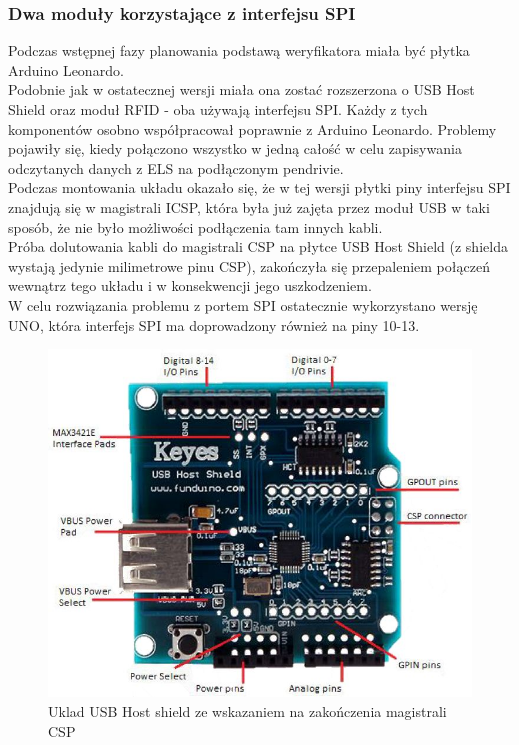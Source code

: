 \documentclass[declaration,shortabstract, mgr]{iithesis}
\begin{document}
\subsubsection{Dwa moduły korzystające z interfejsu SPI}
\indent Podczas wstępnej fazy planowania podstawą weryfikatora miała być płytka Arduino Leonardo. \\
\indent Podobnie jak w ostatecznej wersji miała ona zostać rozszerzona o USB Host Shield oraz moduł RFID - oba używają interfejsu SPI. Każdy z tych komponentów osobno współpracował poprawnie z Arduino Leonardo. Problemy pojawiły się, kiedy połączono wszystko w jedną całość w celu zapisywania odczytanych danych z ELS na podłączonym pendrivie. \\
\indent Podczas montowania układu okazało się, że w tej wersji płytki piny interfejsu SPI znajdują się w magistrali ICSP, która była już zajęta przez moduł USB w taki sposób, że nie było możliwości podłączenia tam innych kabli. \\
\indent Próba dolutowania kabli do magistrali CSP na płytce USB Host Shield (z shielda wystają jedynie milimetrowe pinu CSP), zakończyła się przepaleniem połączeń wewnątrz tego układu i w konsekwencji jego uszkodzeniem. \\
\indent W celu rozwiązania problemu z portem SPI ostatecznie wykorzystano wersję UNO, która interfejs SPI ma doprowadzony również na piny 10-13. \\
\begin{figure}[h]
\caption{Uklad USB Host shield ze wskazaniem na zakończenia magistrali CSP}
\centering
\includegraphics[scale=0.3]{usb_host_shield.jpg}
\end{figure}
\end{document}
